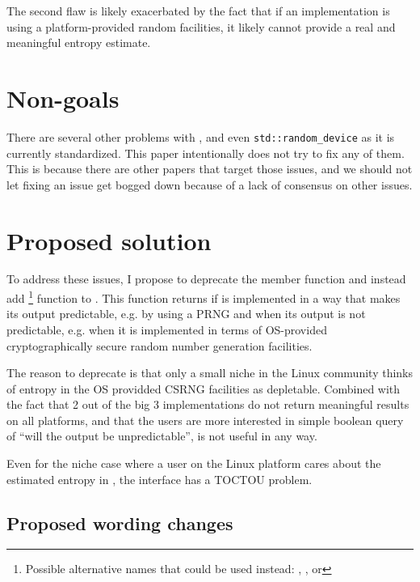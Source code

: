\documentclass{wg21}
\begin{document}
The second flaw is likely exacerbated by the fact that if an implementation
is using a platform-provided random facilities, it likely cannot provide
a real and meaningful entropy estimate.

\hypertarget{non-goals}{%
    \section{Non-goals}\label{non-goals}}

There are several other problems with , and even
\texttt{std::random_device} as it is currently standardized. This paper
intentionally does not try to fix any of them.
This is because there are other papers that target those issues, and we
should not let fixing an issue get bogged down because of a lack of consensus
on other issues.


\hypertarget{proposed-solution}{%
    \section{Proposed solution}\label{proposed-solution}}

To address these issues, I propose to deprecate the 
member function and instead add %
\footnote{Possible alternative names that could be used instead:
, ,
or }
function to . This function returns  if
\mbox{} is implemented in a way that makes its
output predictable, e.g. by using a PRNG and  when its output
is not predictable, e.g. when it is implemented in terms of OS-provided
cryptographically secure random number generation facilities.

The reason to deprecate  is that only a small niche in
the Linux community thinks of entropy in the OS providded CSRNG facilities
as depletable. Combined with the fact that 2 out of the big 3
implementations do not return meaningful results on all platforms, and
that the users are more interested in simple boolean query of ``will
the output be unpredictable'',  is not useful in any way.

Even for the niche case where a user on the Linux platform cares about
the estimated entropy in , the interface has a TOCTOU
problem.


\hypertarget{constexpr-query-wording}{%
    \subsection{Proposed wording changes}\label{constexpr-query-wording}}
\end{document}
